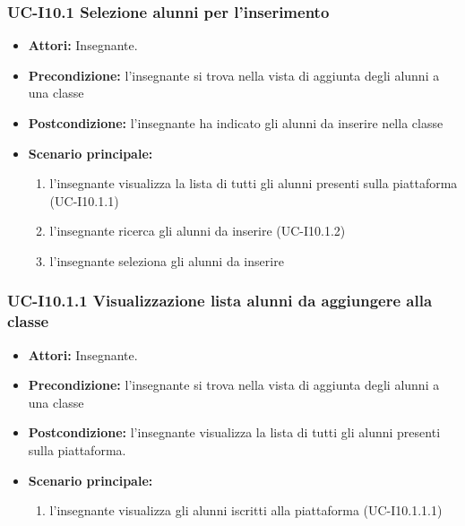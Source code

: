 \subsubsection{UC-I10.1 Selezione alunni per l'inserimento}
\begin{itemize}
	\item \textbf{Attori:} Insegnante.
	\item \textbf{Precondizione:} l'insegnante si trova nella vista di aggiunta degli alunni a una classe
	\item \textbf{Postcondizione:} l'insegnante ha indicato gli alunni da inserire nella classe
	\item \textbf{Scenario principale:}
	\begin{enumerate}
		\item l'insegnante visualizza la lista di tutti gli alunni presenti sulla piattaforma (UC-I10.1.1)
		\item l'insegnante ricerca gli alunni da inserire (UC-I10.1.2)	
		\item l'insegnante seleziona gli alunni da inserire
	\end{enumerate}
\end{itemize}

\subsubsection{UC-I10.1.1 Visualizzazione lista alunni da aggiungere alla classe}
\begin{itemize}
	\item \textbf{Attori:} Insegnante.
	\item \textbf{Precondizione:} l'insegnante si trova nella vista di aggiunta degli alunni a una classe
	\item \textbf{Postcondizione:} l'insegnante visualizza la lista di tutti gli alunni presenti sulla piattaforma.
	\item \textbf{Scenario principale:}
	\begin{enumerate}
		\item l'insegnante visualizza gli alunni iscritti alla piattaforma (UC-I10.1.1.1)
	\end{enumerate}
\end{itemize}

